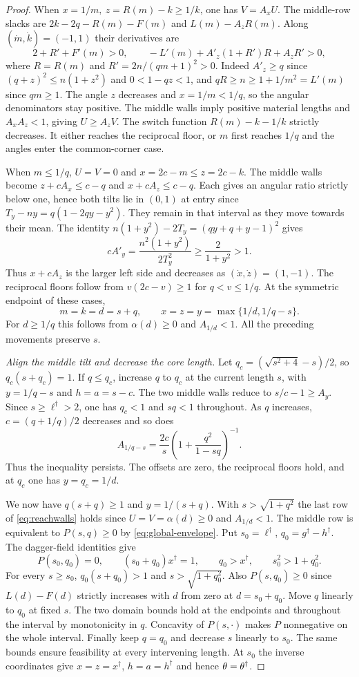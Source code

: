 \begin{proof}
When $x=1/m,\ z=R(m)-k\ge1/k$, one has $V=A_xU$. The middle-row slacks are $2k-2q-R(m)-F(m)$ and $L(m)-A_zR(m)$. Along $(\dot m,\dot k)=(-1,1)$ their derivatives are
\[
 2+R'+F'(m)>0,\qquad
 -L'(m)+A'_z(1+R')R+A_zR'>0,
\]
where $R=R(m)$ and $R'=2n/(qm+1)^2>0$. Indeed $A'_z\ge q$ since $(q+z)^2\le n(1+z^2)$ and $0<1-qz<1$, and $qR\ge n\ge1+1/m^2=L'(m)$ since $qm\ge1$. The angle $z$ decreases and $x=1/m<1/q$, so the angular denominators stay positive. The middle walls imply positive material lengths and $A_xA_z<1$, giving $U\ge A_zV$. The switch function $R(m)-k-1/k$ strictly decreases. It either reaches the reciprocal floor, or $m$ first reaches $1/q$ and the angles enter the common-corner case.

When $m\le1/q$, $U=V=0$ and $x=2c-m\le z=2c-k$. The middle walls become $z+cA_x\le c-q$ and $x+cA_z\le c-q$. Each gives an angular ratio strictly below one, hence both tilts lie in $(0,1)$ at entry since $T_y-ny=q(1-2qy-y^2)$. They remain in that interval as they move towards their mean. The identity $n(1+y^2)-2T_y=(qy+q+y-1)^2$ gives
\[
 cA'_y=\frac{n^2(1+y^2)}{2T_y^2}\ge\frac{2}{1+y^2}>1 .
\]
Thus $x+cA_z$ is the larger left side and decreases as $(\dot x,\dot z)=(1,-1)$. The reciprocal floors follow from $v(2c-v)\ge1$ for $q<v\le1/q$. At the symmetric endpoint of these cases,
\[
 m=k=d=s+q,\qquad x=z=y=\max\{1/d,1/q-s\}.
\]
For $d\ge1/q$ this follows from $\alpha(d)\ge0$ and $A_{1/d}<1$. All the preceding movements preserve $s$.

\emph{Align the middle tilt and decrease the core length.}
Let $q_c=(\sqrt{s^2+4}-s)/2$, so $q_c(s+q_c)=1$. If $q\le q_c$, increase $q$ to $q_c$ at the current length $s$, with $y=1/q-s$ and $h=a=s-c$. The two middle walls reduce to $s/c-1\ge A_y$. Since $s\ge\ell^\dagger>2$, one has $q_c<1$ and $sq<1$ throughout. As $q$ increases, $c=(q+1/q)/2$ decreases and so does
\[
 A_{1/q-s}=\frac{2c}{s}\left(1+\frac{q^2}{1-sq}\right)^{-1}.
\]
Thus the inequality persists. The offsets are zero, the reciprocal floors hold, and at $q_c$ one has $y=q_c=1/d$.

We now have $q(s+q)\ge1$ and $y=1/(s+q)$. With $s>\sqrt{1+q^2}$ the last row of \eqref{eq:reachwalls} holds since $U=V=\alpha(d)\ge0$ and $A_{1/d}<1$. The middle row is equivalent to $P(s,q)\ge0$ by \eqref{eq:global-envelope}. Put $s_0=\ell^\dagger$, $q_0=g^\dagger-h^\dagger$. The dagger-field identities give
\[
 P(s_0,q_0)=0,\qquad (s_0+q_0)x^\dagger=1,\qquad
 q_0>x^\dagger,\qquad s_0^2>1+q_0^2.
\]
For every $s\ge s_0$, $q_0(s+q_0)>1$ and $s>\sqrt{1+q_0^2}$. Also $P(s,q_0)\ge0$ since $L(d)-F(d)$ strictly increases with $d$ from zero at $d=s_0+q_0$. Move $q$ linearly to $q_0$ at fixed $s$. The two domain bounds hold at the endpoints and throughout the interval by monotonicity in $q$. Concavity of $P(s,\cdot)$ makes $P$ nonnegative on the whole interval. Finally keep $q=q_0$ and decrease $s$ linearly to $s_0$. The same bounds ensure feasibility at every intervening length. At $s_0$ the inverse coordinates give $x=z=x^\dagger$, $h=a=h^\dagger$ and hence $\theta=\theta^\dagger$.


\end{proof}
